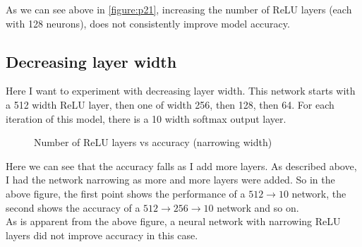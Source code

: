 \documentclass[11pt]{article}
\begin{document}
\begin{homeworkProblem}
    As we can see above in \autoref{figure:p21}, increasing the number of ReLU layers (each with 128 neurons), does not consistently improve model accuracy.

    \subsection{Decreasing layer width}

    Here I want to experiment with decreasing layer width. This network starts with a 512 width ReLU layer, then one of width 256, then 128, then 64. For each iteration of this model, there is a 10 width softmax output layer.

    \pagebreak
    \begin{figure}[hb!]
        \centering
        \vspace{-0.1cm}
        \caption{Number of ReLU layers vs accuracy (narrowing width)}
        \label{figure:p22}
    \end{figure}

    Here we can see that the accuracy falls as I add more layers. As described above, I had the network narrowing as more and more layers were added. So in the above figure, the first point shows the performance of a $512 \rightarrow 10$ network, the second shows the accuracy of a $512 \rightarrow 256 \rightarrow 10$ network and so on. \\

    As is apparent from the above figure, a neural network with narrowing ReLU layers did not improve accuracy in this case.

\end{homeworkProblem}
\end{document}
